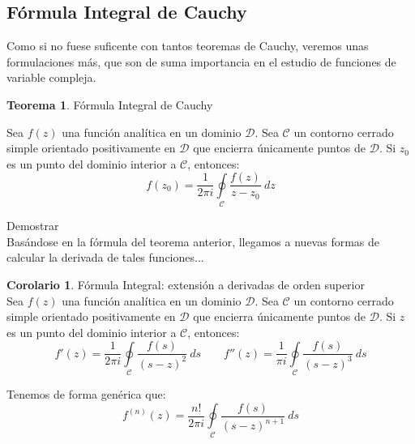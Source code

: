 \documentclass[12pt]{article}
\theoremstyle{definition}
\theoremstyle{theorem}
\newtheorem{theorem}{Teorema}[section]
\theoremstyle{corolary}
\newtheorem{corolary}{Corolario}[section]
\begin{document}
\subsection{F\'ormula Integral de Cauchy}
Como si no fuese suficente con tantos teoremas de Cauchy, veremos unas formulaciones m\'as, que son de suma importancia en el estudio de funciones de variable compleja.\\

\colorbox{red!40!white!80}{\parbox{\linewidth}{
\theoremstyle{theorem}
\begin{theorem} {F\'ormula Integral de Cauchy}

Sea $f(z)$  una funci\'on anal\'itica en un dominio $\mathcal{D}$. Sea $\mathcal{C}$ un contorno cerrado simple orientado positivamente en $\mathcal{D}$ que encierra \'unicamente puntos de $\mathcal{D}$. Si $z_0$ es un punto del dominio interior a $\mathcal{C}$, entonces: $$f(z_0) = \frac{1}{2\pi i}\oint\limits_{\mathcal{C}}\frac{f(z)}{z-z_0}\ dz$$

\end{theorem}}}
\linebreak

Demostrar\\

Bas\'andose en la f\'ormula del teorema anterior, llegamos a nuevas formas de calcular la derivada de tales funciones...\\

\colorbox{pink!40!white!80}{\parbox{\linewidth}{
\theoremstyle{theorem}
\begin{corolary} {F\'ormula Integral: extensi\'on a derivadas de orden superior}\\

Sea $f(z)$  una funci\'on anal\'itica en un dominio $\mathcal{D}$. Sea $\mathcal{C}$ un contorno cerrado simple orientado positivamente en $\mathcal{D}$ que encierra \'unicamente puntos de $\mathcal{D}$. Si $z$ es un punto del dominio interior a $\mathcal{C}$, entonces:
$$f'(z) = \frac{1}{2\pi i}\oint\limits_{\mathcal{C}}\frac{f(s)}{(s-z)^2}\ ds \qquad f''(z) = \frac{1}{\pi i}\oint\limits_{\mathcal{C}}\frac{f(s)}{(s-z)^3}\ ds$$

Tenemos de forma gen\'erica que: $$f^{(n)}(z) = \frac{n!}{2\pi i}\oint\limits_{\mathcal{C}}\frac{f(s)}{(s-z)^{n+1}}\ ds$$

\end{corolary}}}
\linebreak
\linebreak
\end{document}
